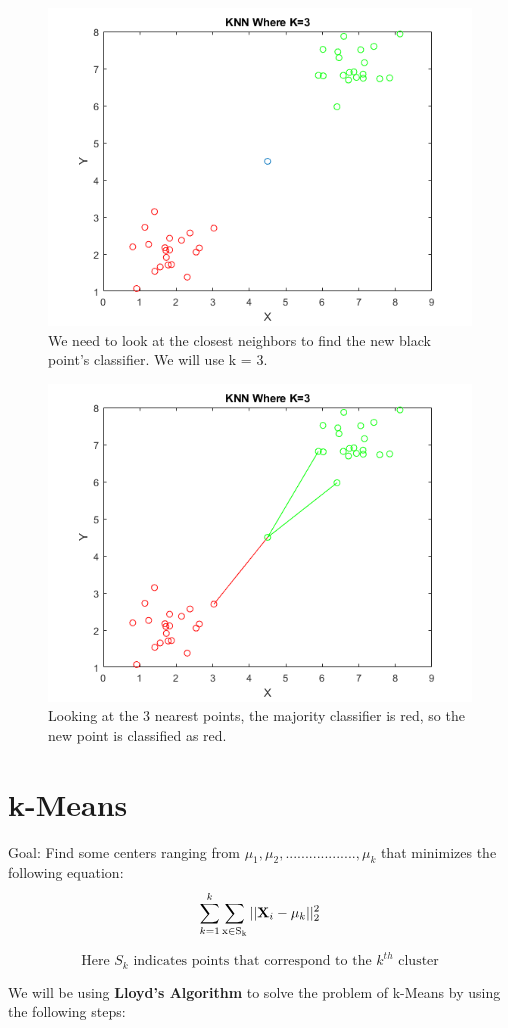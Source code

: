 \documentclass{article}
\theoremstyle{definition}
\begin{document}
\begin{figure}[H]
	\centering
	\includegraphics[width=0.5\linewidth, scale=0.5]{Knn3before.png}
	\caption{We need to look at the closest neighbors to find the new black point's classifier. We will use k = 3.}
\end{figure}

\begin{figure}[H]
	\centering
	\includegraphics[width=0.5\linewidth, scale=0.5]{Knn3after.png}
	\caption{Looking at the 3 nearest points, the majority classifier is red, so the new point is classified as red.}
\end{figure}

\section{k-Means}

Goal: Find some centers ranging from $\mu_1, \mu_2, ..................,\mu_k$ that minimizes the following equation:
\begin{equation*}  
\sum_{k=1}^{k}\sum_{\rm{x} \in S_k} || \textbf{X}_i-\mu_k||_2^2
\end{equation*}


\begin{equation*} \text{Here } S_k \text{ indicates points that correspond to the }k^{th} \text{ cluster}
\end{equation*}



We will be using \textbf{Lloyd's  Algorithm} to solve the problem of k-Means by using the following steps:
\end{document}
